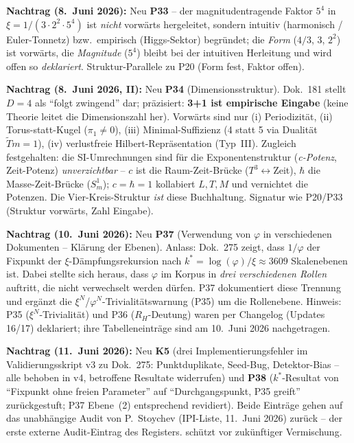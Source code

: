 \medskip

\textbf{Nachtrag (8.~Juni 2026):} Neu \textbf{P33} -- der magnitudentragende
Faktor $5^4$ in $\xi = 1/(3\cdot2^2\cdot5^4)$ ist \emph{nicht} vorwärts
hergeleitet, sondern intuitiv (harmonisch / Euler-Tonnetz) bzw.\ empirisch
(Higgs-Sektor) begründet; die \emph{Form} ($4/3$, $3$, $2^2$) ist vorwärts, die
\emph{Magnitude} ($5^4$) bleibt bei der intuitiven Herleitung und wird offen so
\emph{deklariert}. Struktur-Parallele zu P20 (Form fest, Faktor offen).

\medskip

\textbf{Nachtrag (8.~Juni 2026, II):} Neu \textbf{P34} (Dimensionsstruktur).
Dok.~181 stellt $D=4$ als \enquote{folgt zwingend} dar; präzisiert: \textbf{3+1
ist empirische Eingabe} (keine Theorie leitet die Dimensionszahl her). Vorwärts
sind nur (i) Periodizität, (ii) Torus-statt-Kugel ($\pi_1\neq0$), (iii)
Minimal-Suffizienz (4 statt 5 via Dualität $\tilde T m=1$), (iv) verlustfreie
Hilbert-Repräsentation (Typ~III). Zugleich festgehalten: die SI-Umrechnungen sind
für die Exponentenstruktur (\emph{c-Potenz}, Zeit-Potenz) \emph{unverzichtbar} --
$c$ ist die Raum-Zeit-Brücke ($T^3\leftrightarrow$Zeit), $\hbar$ die
Masse-Zeit-Brücke ($S^1_m$); $c=\hbar=1$ kollabiert $L,T,M$ und vernichtet die
Potenzen. Die Vier-Kreis-Struktur \emph{ist} diese Buchhaltung. Signatur wie
P20/P33 (Struktur vorwärts, Zahl Eingabe).

\medskip

\textbf{Nachtrag (10.~Juni 2026):} Neu \textbf{P37} (Verwendung von $\varphi$
in verschiedenen Dokumenten -- Klärung der Ebenen). Anlass: Dok.~275 zeigt,
dass $1/\varphi$ der Fixpunkt der $\xi$-Dämpfungsrekursion nach
$k^* = \log(\varphi)/\xi \approx 3609$ Skalenebenen ist. Dabei stellte sich
heraus, dass $\varphi$ im Korpus in \emph{drei verschiedenen Rollen} auftritt,
die nicht verwechselt werden dürfen. P37 dokumentiert diese Trennung und
ergänzt die $\xi^N$/$\varphi^N$-Trivialitätswarnung (P35) um die Rollenebene.
Hinweis: P35 ($\xi^N$-Trivialität) und P36 ($R_H$-Deutung) waren per Changelog
(Updates 16/17) deklariert; ihre Tabelleneinträge sind am 10.~Juni 2026 nachgetragen.

\textbf{Nachtrag (11.~Juni 2026):} Neu \textbf{K5} (drei Implementierungs\-fehler
im Validierungsskript v3 zu Dok.~275: Punktduplikate, Seed-Bug,
Detektor-Bias -- alle behoben in v4, betroffene Resultate widerrufen)
und \textbf{P38} ($k^*$-Resultat von \enquote{Fixpunkt ohne freien
Parameter} auf \enquote{Durchgangspunkt, P35 greift} zurückgestuft;
P37 Ebene~(2) entsprechend revidiert). Beide Einträge gehen auf das
unabhängige Audit von P.~Stoychev (IPI-Liste, 11.~Juni 2026) zurück --
der erste externe Audit-Eintrag des Registers.
schützt vor zukünftiger Vermischung.

